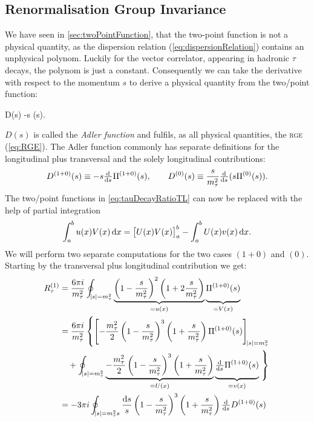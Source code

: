 \documentclass[../../index.tex]{subfiles}
\begin{document}
\subsection{Renormalisation Group Invariance}
We have seen in \cref{sec:twoPointFunction}, that the two-point function is not
a physical quantity, as the dispersion relation (\cref{eq:dispersionRelation})
contains an unphysical polynom. Luckily for the vector correlator, appearing in
hadronic \(\tau\) decays, the polynom is just a constant. Consequently we can
take the derivative with respect to the momentum \(s\) to derive a physical
quantity from the two\-/point function:
\begin{tcolorbox}
  D(s) \equiv -s  \Pi(s).
\end{tcolorbox}
\(D(s)\) is called the \textit{Adler function} and fulfils, as all physical
quantities, the \textsc{rge} (\cref{eq:RGE}). The Adler function commonly has
separate definitions for the longitudinal plus transversal and the solely
longitudinal contributions:
\begin{equation}
  \label{eq:adlerFunction}
  D^{(1+0)}(s) \equiv -s \od{}{s} \Pi^{(1+0)}(s), \qquad D^{(0)}(s) \equiv \frac{s}{m_\tau^2} \od{}{s} (s \Pi^{(0)}(s)).
\end{equation}
The two\-/point functions in \cref{eq:tauDecayRatioTL} can now be replaced with
the help of partial integration
\begin{equation}
  \int_a^b u(x) V(x) \dif x = \left[ U(x) V(x) \right]_a^b - \int_a^b U(x) v(x) \dif x.
\end{equation}
We will perform two separate computations for the two cases \((1+0)\) and
\((0)\). Starting by the transversal plus longitudinal contribution we get:
\begin{equation}
  \begin{split}
    R_\tau^{(1)} &= \frac{6 \pi i}{m_\tau^2}
    \oint_{\abs{s}=m_\tau^2}\underbrace{ \left( 1 - \frac{s}{m_\tau^2} \right)^2
      \left( 1 + 2 \frac{s}{m_\tau^2} \right)
    }_{= u(x)} \underbrace{ \vphantom{\left( \frac{s}{m_\tau^2} \right)} \Pi^{(1+0)}(s)}_{=V(x)} \\
    &= \frac{6 \pi i}{m_\tau^2} \left\{ \left[ -\frac{m_\tau^2}{2} \left( 1 -
          \frac{s}{m_\tau^2} \right)^3 \left( 1 + \frac{s}{m_\tau^2} \right)
        \Pi^{(1+0)}(s) \right]_{\abs{s}=m_\tau^2} \right. \\
    &\quad+ \oint_{\abs{s}=m_\tau^2} \underbrace{-\frac{m_\tau^2}{2} \left( 1 -
        \frac{s}{m_\tau^2} \right)^3 \left( 1 + \frac{s}{m_\tau^2} \right)
    }_{=U(x)} \underbrace{\vphantom{\left( \frac{1}{m_\tau^2} \right)}\od{}{s}
      \Pi^{(1+0)}(s)}_{=v(x)}
    \left. \vphantom{\left[ \left( \frac{1}{m_\tau^2} \right) \right]} \right\} \\
    &= -3 \pi i \oint_{\abs{s}=m_\tau^2s} \frac{\dif s}{s} \left( 1 -
      \frac{s}{m_\tau^2} \right)^3 \left( 1 + \frac{s}{m_\tau^2} \right)
    \od{}{s} D^{(1+0)}(s)
  \end{split}
\end{equation}
\end{document}
